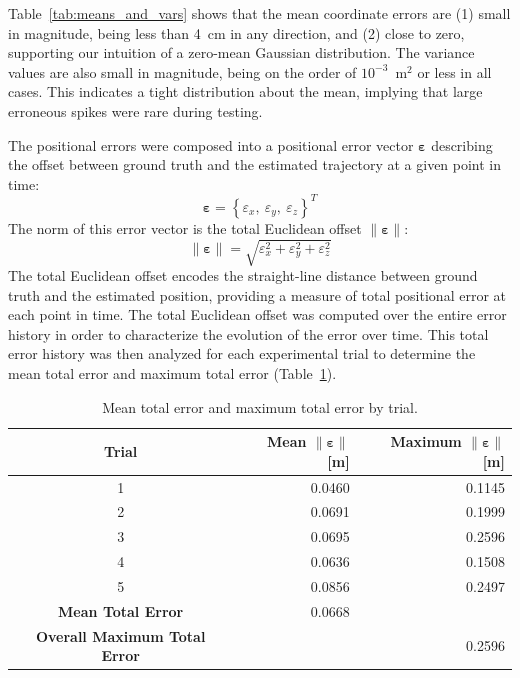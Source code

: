 Table~\ref{tab:means_and_vars} shows that the mean coordinate errors are (1) small in magnitude, being less than 4~cm in any direction, and (2) close to zero, supporting our intuition of a zero-mean Gaussian distribution. The variance values are also small in magnitude, being on the order of $10^{-3}$~m$^{2}$ or less in all cases. This indicates a tight distribution about the mean, implying that large erroneous spikes were rare during testing.

The positional errors were composed into a positional error vector $\bm{\varepsilon}$ describing the offset between ground truth and the estimated trajectory at a given point in time:
%
\begin{equation}
\bm{\varepsilon} = \left\lbrace \varepsilon_{x},\ \varepsilon_{y},\ \varepsilon_{z} \right\rbrace ^{T}
\end{equation}
%
The norm of this error vector is the total Euclidean offset $\| \bm{\varepsilon} \|$:
%
\begin{equation}
\| \bm{\varepsilon} \| = \sqrt{\varepsilon_{x}^{2} + \varepsilon_{y}^{2} + \varepsilon_{z}^{2}} 
\end{equation}
%
The total Euclidean offset encodes the straight-line distance between ground truth and the estimated position, providing a measure of total positional error at each point in time. The total Euclidean offset was computed over the entire error history in order to characterize the evolution of the error over time. This total error history was then analyzed for each experimental trial to determine the mean total error and maximum total error (Table~\ref{tab:total_err}).

\begin{table}[h]\centering
\caption[Mean Total Error and Maximum Total Error by Trial]{Mean total error and maximum total error by trial.}
\begin{tabular}[c]{crr}
\toprule
Trial & Mean $\| \bm{\varepsilon} \|$ [m] & Maximum $\| \bm{\varepsilon} \|$ [m] \\
\hline
1 & 0.0460 & 0.1145 \\
2 & 0.0691 & 0.1999 \\
3 & 0.0695 & 0.2596 \\
4 & 0.0636 & 0.1508 \\
5 & 0.0856 & 0.2497 \\
\hline
\textbf{Mean Total Error} & 0.0668 \\
\hline
\textbf{Overall Maximum Total Error} && 0.2596 \\
\bottomrule
\end{tabular}
\label{tab:total_err}
\end{table}

